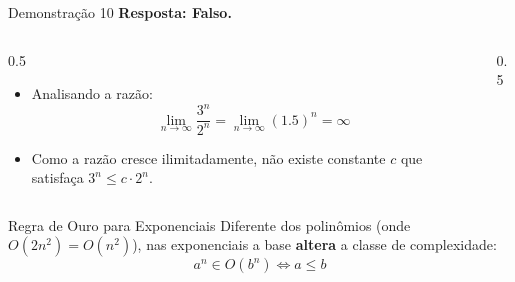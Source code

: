 \documentclass[aspectratio=169]{beamer}
\begin{document}
\begin{frame}[shrink]{Demonstração 10}
    \textbf{Resposta: Falso.}
    
    \begin{columns}
        \begin{column}{0.5\textwidth}
            \begin{itemize}
                \item Analisando a razão:
                \[ \lim_{n \to \infty} \frac{3^n}{2^n} = \lim_{n \to \infty} (1.5)^n = \infty \]
                \item Como a razão cresce ilimitadamente, não existe constante $c$ que satisfaça $3^n \le c \cdot 2^n$.
            \end{itemize}
        \end{column}
        
        \begin{column}{0.5\textwidth}
            \centering
        \end{column}
    \end{columns}

    \begin{block}{Regra de Ouro para Exponenciais}
        Diferente dos polinômios (onde $O(2n^2) = O(n^2)$), nas exponenciais a base \textbf{altera} a classe de complexidade:
        \[ a^n \in O(b^n) \iff a \le b \]
    \end{block}
\end{frame}
\end{document}
